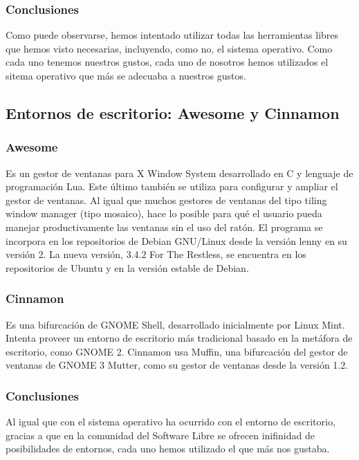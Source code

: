 \documentclass[12pt,a4papert,woside,openright,titlepage,final]{book}
\begin{document}
\subsubsection{Conclusiones}

Como puede observarse, hemos intentado utilizar todas las herramientas libres
que hemos visto necesarias, incluyendo, como no, el sistema operativo. Como cada uno
tenemos nuestros gustos, cada uno de nosotros hemos utilizados el sitema
operativo que más se adecuaba a nuestros gustos. 


\subsection{Entornos de escritorio: Awesome y Cinnamon}

\subsubsection{Awesome}

Es un gestor de ventanas para X Window System desarrollado en C y lenguaje de
programación Lua. Este último también se utiliza para configurar y ampliar el
gestor de ventanas. Al igual que muchos gestores de ventanas del tipo tiling
window manager (tipo mosaico), hace lo posible para qué el usuario pueda manejar
productivamente las ventanas sin el uso del ratón.  El programa se incorpora en
los repositorios de Debian GNU/Linux desde la versión lenny en su versión 2. La
nueva versión, 3.4.2 For The Restless, se encuentra en los repositorios de
Ubuntu y en la versión estable de Debian.

\subsubsection{Cinnamon}

Es una bifurcación de GNOME Shell, desarrollado inicialmente por Linux Mint.
Intenta proveer un entorno de escritorio más tradicional basado en la metáfora
de escritorio, como GNOME 2. Cinnamon usa Muffin, una bifurcación del gestor de
ventanas de GNOME 3 Mutter, como su gestor de ventanas desde la versión 1.2.

\subsubsection{Conclusiones}

Al igual que con el sistema operativo ha ocurrido con el entorno de escritorio,
gracias a que en la comunidad del Software Libre se ofrecen inifinidad de
posibilidades de entornos, cada uno hemos utilizado el que más nos gustaba.
\end{document}
